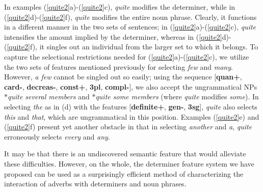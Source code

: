 
In examples (\ref{quite2}a)-(\ref{quite2}c), {\it quite} modifies the determiner, while in (\ref{quite2}d)-(\ref{quite2}f),
{\it quite} modifies the entire noun phrase.  Clearly, it functions in a
different manner in the two sets of sentences; in (\ref{quite2}a)-(\ref{quite2}c), {\it quite}
intensifies the amount implied by the determiner, whereas in (\ref{quite2}d)-(\ref{quite2}f), it
singles out an individual from the larger set to which it belongs.  To capture
the selectional restrictions needed for (\ref{quite2}a)-(\ref{quite2}c), we utilize the two sets of
features mentioned previously for selecting {\it few} and {\it many}.  However,
{\it a few} cannot be singled out so easily; using the sequence [{\bf quan+},
{\bf card-}, {\bf decreas-}, {\bf const+}, {\bf 3pl}, {\bf compl-}], we also
accept the ungrammatical NPs {\it $\ast$quite several members} and {\it
$\ast$quite some members} (where {\it quite} modifies {\it some}).  In
selecting {\it the} as in (d) with the features [{\bf definite+}, {\bf gen-}, {\bf
3sg}], {\it quite} also selects {\it this} and {\it that}, which are
ungrammatical in this position.  Examples (\ref{quite2}e) and (\ref{quite2}f) present yet another
obstacle in that in selecting {\it another} and {\it a}, {\it quite}
erroneously selects {\it every} and {\it any}.

It may be that there is an undiscovered semantic feature that would
alleviate these difficulties.  However, on the whole, the determiner feature system we have proposed can be
used as a surprisingly efficient method of characterizing the interaction of
adverbs with determiners and noun phrases.









